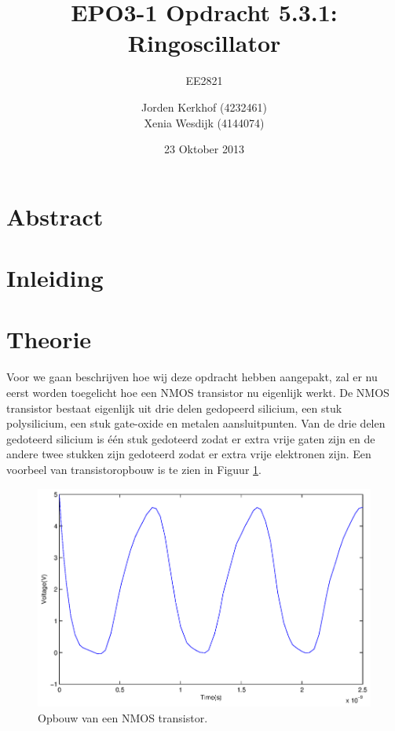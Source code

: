 \documentclass{scrartcl}  %
\author{Jorden {Kerkhof} (4232461)  \\{Xenia Wesdijk} (4144074)}
\title{EPO3-1   Opdracht 5.3.1: Ringoscillator}
\subtitle{EE2821}
\date{23 Oktober 2013}
\begin{document}
\maketitle
\vspace{80 mm}
\section*{Abstract}

\newpage
\setlength{\cftbeforetoctitleskip}{-3em}
\tableofcontents
\newpage
{}
\section{Inleiding}


\section{Theorie}
Voor we gaan beschrijven hoe wij deze opdracht hebben aangepakt, zal er nu eerst worden toegelicht hoe een NMOS transistor nu eigenlijk werkt. 
De NMOS transistor bestaat eigenlijk uit drie delen gedopeerd silicium, een stuk polysilicium, een stuk gate-oxide en metalen aansluitpunten. 
Van de drie delen gedoteerd silicium is één stuk gedoteerd zodat er extra vrije gaten zijn en de andere twee stukken zijn gedoteerd zodat er extra vrije elektronen zijn. 
Een voorbeel van transistoropbouw is te zien in Figuur \ref{fig:NMOS-transistor}.
\begin{figure}[H]
\centering
	\includegraphics[width=\textwidth]{images/3-inverter-oscillator}
	\caption{Opbouw van een NMOS transistor.\cite{patel-slides}}
	\label{fig:NMOS-transistor}
\end{figure}
\end{document}
